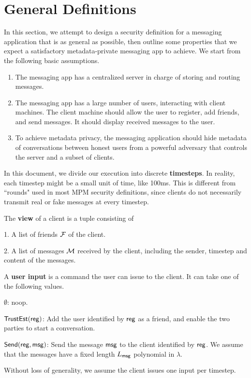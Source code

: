 \newcommand{\Leak}{\mathsf{Leak}}
\section{General Definitions}

In this section, we attempt to design a security definition for a messaging application that is as general as possible, then outline some properties that we expect a satisfactory metadata-private messaging app to achieve. We start from the following basic assumptions.
\begin{enumerate}
    \item The messaging app has a centralized server in charge of storing and routing messages.
    \item The messaging app has a large number of users, interacting with client machines. The client machine should allow the user to register, add friends, and send messages. It should display received messages to the user.
    \item To achieve metadata privacy, the messaging application should hide metadata of conversations between honest users from a powerful adversary that controls the server and a subset of clients. 
\end{enumerate}
\begin{definition}
In this document, we divide our execution into discrete \textbf{timesteps}. In reality, each timestep might be a small unit of time, like 100ms. This is different from ``rounds" used in most MPM security definitions, since clients do not necessarily transmit real or fake messages at every timestep.
\end{definition}
\begin{definition}
The \textbf{view} of a client is a tuple consisting of

1. A list of friends $\mathcal{F}$ of the client.

2. A list of messages $\mathcal{M}$ received by the client, including the sender, timestep and content of the messages. 
\end{definition}
\begin{definition}
A \textbf{user input} is a command the user can issue to the client. It can take one of the following values.

$\emptyset$: noop.

$\mathsf{TrustEst}(\mathsf{reg})$: Add the user identified by $\mathsf{reg}$ as a friend, and enable the two parties to start a conversation.

$\mathsf{Send}(\mathsf{reg}, \mathsf{msg})$: Send the message $\mathsf{msg}$ to the client identified by $\mathsf{reg}$. We assume that the messages have a fixed length $L_{\mathsf{msg}}$ polynomial in $\lambda$.


Without loss of generality, we assume the client issues one input per timestep.
\end{definition}
